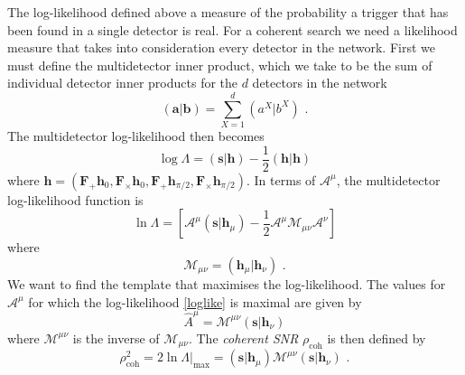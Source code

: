 \documentclass[11pt]{cuthesis}
\newcommand{\fs}{\text{ .}}
\begin{document}
The log-likelihood defined above a measure of the probability a trigger that has been found in a single detector is real. For a coherent search we need a likelihood measure that takes into consideration every detector in the network. First we must define the multidetector inner product, which we take to be the sum of individual detector inner products for the $d$ detectors in the network
\begin{equation}
(\textbf{a}|\textbf{b}) = \sum_{X=1}^d (a^X|b^X) \textbf{ .}
\end{equation}
The multidetector log-likelihood then becomes
\begin{equation}
\log \Lambda = (\textbf{s}|\textbf{h}) - \frac{1}{2}(\textbf{h}|\textbf{h}) \end{equation}
where $\textbf{h} = (\textbf{F}_+ \textbf{h}_0,\textbf{F}_\times \textbf{h}_0,\textbf{F}_+ \textbf{h}_{\pi/2},\textbf{F}_\times \textbf{h}_{\pi/2})$. In terms of $\mathcal{A}^\mu$, the multidetector log-likelihood function is
\begin{equation} \label{loglike}
\ln \Lambda = \left[ \mathcal{A}^\mu(\textbf{s}|\textbf{h}_\mu) - \frac{1}{2}\mathcal{A}^\mu \mathcal{M}_{\mu\nu}\mathcal{A}^\nu \right]
\end{equation}
where
\begin{equation}
\mathcal{M}_{\mu\nu} = (\textbf{h}_\mu|\textbf{h}_\nu) \fs
\end{equation}
We want to find the template that maximises the log-likelihood. The values for $\mathcal{A}^\mu$ for which the log-likelihood \ref{loglike} is maximal are given by
\begin{equation}
\hat{A}^\mu =\mathcal{M}^{\mu\nu}(\textbf{s}|\textbf{h}_\nu)
\end{equation}
where $\mathcal{M}^{\mu\nu}$ is the inverse of $\mathcal{M}_{\mu\nu}$. The \textit{coherent SNR} $\rho_\text{coh}$ is then defined by
\begin{equation} \label{rhocoh1}
\rho^2_\text{coh} = 2\ln \Lambda |_\text{max} = (\textbf{s}|\textbf{h}_\mu)\mathcal{M}^{\mu\nu}(\textbf{s}|\textbf{h}_\nu) \fs
\end{equation}
\end{document}
